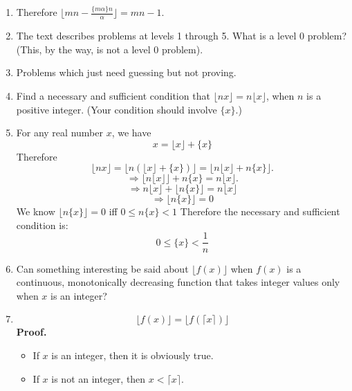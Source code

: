 \documentclass[12pt,a4paper]{article}
\makeatletter
\newtheorem*{solution}{Solution}
\theoremstyle{definition}
\renewenvironment{solution}[1][Solution] {\par\pushQED{\qed}\normalfont\topsep6\p@\@plus6\p@\relax\trivlist\item[\hskip\labelsep\bfseries#1\@addpunct{.}]\ignorespaces}{\popQED\endtrivlist\@endpefalse} \makeatother
\makeatother
\begin{document}
\begin{enumerate}
\begin{solution}
        	Therefore $\lfloor mn-\frac{\{m\alpha \}n}{\alpha}
        	\rfloor=mn-1$.
        \end{solution}
    \item 
        The text describes problems at levels 1 through 5. What is a level 0 problem? (This, by the way, is not a level 0 problem).
        \begin{solution}
        	Problems which just need guessing but not proving.
        \end{solution}
    \item 
        Find a necessary and sufficient condition that $\lfloor nx \rfloor=n\lfloor x \rfloor$, when $n$ is a positive integer. (Your condition should involve $\{x\}$.)
        \begin{solution}
        	For any real number $x$, we have 
        	\begin{equation*}
        	    x=\lfloor x \rfloor + \{x\}
        	\end{equation*}
        	Therefore 
        	\begin{equation*}
        	    \lfloor nx \rfloor=\lfloor n(\lfloor x \rfloor+\{x\})\rfloor=\lfloor n\lfloor x \rfloor+n\{x\}\rfloor.
        	\end{equation*}
        	\begin{equation*}
        	   \Rightarrow \lfloor n \lfloor x \rfloor\rfloor + n \{x\}=n \lfloor x \rfloor.
        	\end{equation*}
        	\begin{equation*}
        	   \Rightarrow n\lfloor x \rfloor +\lfloor n\{x\} \rfloor=n \lfloor x \rfloor
        	\end{equation*}
        	\begin{equation*}
        	    \Rightarrow\lfloor n\{x\} \rfloor=0
        	\end{equation*}
        	We know $\lfloor n\{x\} \rfloor=0$ iff $0\le n\{x\}<1$
        	Therefore the necessary and sufficient condition is:
        	\begin{equation*}
        	    0\le\{x\}<\frac{1}{n}
        	\end{equation*}
        \end{solution}
    \item 
        Can something interesting be said about $\lfloor f(x) \rfloor$ when $f(x)$ is a continuous, monotonically decreasing function that takes integer values only when $x$ is an integer?
        \begin{solution}
        	\begin{equation*}
        	    \lfloor f(x) \rfloor=\lfloor f(\lceil x \rceil) \rfloor
        	\end{equation*}
        	\textbf{Proof.}
        	\begin{itemize}
        		\item 
        		    If $x$ is an integer, then it is obviously true.
        		\item 
        		    If $x$ is not an integer, then $x<\lceil x \rceil$.
        		    

\end{itemize}
\end{solution}
\end{enumerate}
\end{document}
